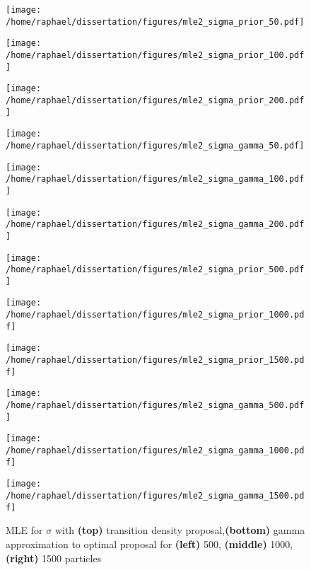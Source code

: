 \documentclass{article}
\begin{document}
	\begin{figure}[htb]
		\centering
		\begin{minipage}{0.3\textwidth}
			\centering
			\texttt{[image: /home/raphael/dissertation/figures/mle2\_sigma\_prior\_50.pdf]}
		\end{minipage}
		\begin{minipage}{.3\textwidth}
			\centering
			\texttt{[image: /home/raphael/dissertation/figures/mle2\_sigma\_prior\_100.pdf]}
		\end{minipage}
		\begin{minipage}{0.3\textwidth}
			\centering
			\texttt{[image: /home/raphael/dissertation/figures/mle2\_sigma\_prior\_200.pdf]}
		\end{minipage}
		\begin{minipage}{0.3\textwidth}
			\centering
			\texttt{[image: /home/raphael/dissertation/figures/mle2\_sigma\_gamma\_50.pdf]}
		\end{minipage}
		\begin{minipage}{.3\textwidth}
			\centering
			\texttt{[image: /home/raphael/dissertation/figures/mle2\_sigma\_gamma\_100.pdf]}
		\end{minipage}
		\begin{minipage}{.3\textwidth}
			\centering
			\texttt{[image: /home/raphael/dissertation/figures/mle2\_sigma\_gamma\_200.pdf]}
		\end{minipage}
		
		\begin{minipage}{0.3\textwidth}
			\centering
			\texttt{[image: /home/raphael/dissertation/figures/mle2\_sigma\_prior\_500.pdf]}
		\end{minipage}
		\begin{minipage}{.3\textwidth}
			\centering
			\texttt{[image: /home/raphael/dissertation/figures/mle2\_sigma\_prior\_1000.pdf]}
		\end{minipage}
		\begin{minipage}{.3\textwidth}
			\centering
			\texttt{[image: /home/raphael/dissertation/figures/mle2\_sigma\_prior\_1500.pdf]}
		\end{minipage}
		\begin{minipage}{.3\textwidth}
			\centering
			\texttt{[image: /home/raphael/dissertation/figures/mle2\_sigma\_gamma\_500.pdf]}
		\end{minipage}
		\begin{minipage}{.3\textwidth}
			\centering
			\texttt{[image: /home/raphael/dissertation/figures/mle2\_sigma\_gamma\_1000.pdf]}
		\end{minipage}
		\begin{minipage}{.3\textwidth}
			\centering
			\texttt{[image: /home/raphael/dissertation/figures/mle2\_sigma\_gamma\_1500.pdf]}
		\end{minipage}
		\caption{MLE for $\sigma$ with \textbf{(top)} transition density proposal,\textbf{(bottom)} gamma approximation to optimal proposal for \textbf{(left)} 500, \textbf{(middle)} 1000, \textbf{(right)} 1500 particles}
		\label{fig:comparisonsigma}
	\end{figure}
	
\end{document}
